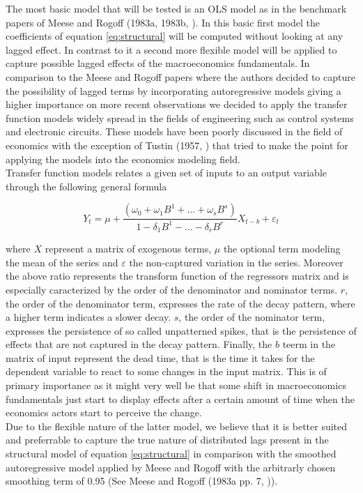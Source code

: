 The most basic model that will be tested is an OLS model as in the benchmark papers of Meese
and Rogoff (1983a, 1983b, \cite{MeeseRogoffa, MeeseRogoffb}). In this basic first model the
coefficients of equation \ref{eq:structural} will be computed without looking at any lagged effect.
In contrast to it a second more flexible model will be applied to capture possible lagged effects
of the macroeconomics fundamentals. In comparison to the Meese and Rogoff papers where the authors decided
to capture the possibility of lagged terms by incorporating autoregressive models giving a higher
importance on more recent observations we decided to apply the transfer function models widely spread in
the fields of engineering such as control systems and electronic circuits. These models have been poorly
discussed in the field of economics with the exception of Tustin (1957, \cite{Tustin}) that tried to
make the point for applying the models into the economics modeling field.\\
Transfer function models relates a given set of inputs to an output variable through the following general formula

\begin{equation} \label{eq:transfer}
  Y_{t} = \mu + \frac{(\omega_{0}+\omega_{1}B^{1}+\dots+\omega_{s}B^{s})}{1-\delta_{1}B^{1}-\dots-\delta_{r}B^{r}}X_{t-b} + \varepsilon_{t}
\end{equation}

where $X$ represent a matrix of exogenous terms, $\mu$ the optional term modeling the mean of the series and
$\varepsilon$ the non-captured variation in the series. Moreover the above ratio represents the transform
function of the regressors matrix and is especially caracterized by the order of the denominator and
nominator terms. $r$, the order of the denominator term, expresses the rate of the decay pattern, where
a higher term indicates a slower decay.  $s$, the order of the nominator term, expresses the persistence of
so called unpatterned spikes, that is the persistence of effects that are not captured in the decay pattern.
Finally, the $b$ teerm in the matrix of input represent the dead time, that is the time it takes for the dependent
variable to react to some changes in the input matrix. This is of primary importance as it might very well be
that some shift in macroeconomics fundamentals just start to display effects after a certain amount of time when
the economics actors start to perceive the change.\\
Due to the flexible nature of the latter model, we believe that it is better suited and preferrable to
capture the true nature of distributed lags present in the structural model of equation \ref{eq:structural} in
comparison with the smoothed autoregressive model applied by Meese and Rogoff with the arbitrarly chosen smoothing
term of 0.95 (See Meese and Rogoff (1983a pp. 7, \cite{MeeseRogoffa})).


